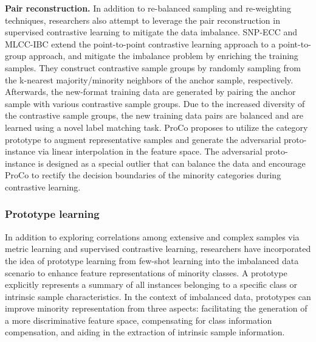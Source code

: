  
\textbf{Pair reconstruction.} 
In addition to re-balanced sampling and re-weighting techniques, researchers also attempt to leverage the {pair reconstruction} in supervised contrastive learning to mitigate the data imbalance.
SNP-ECC \cite{gao2022ensemble} and MLCC-IBC \cite{gao2023imbalanced} extend the point-to-point contrastive learning approach to a point-to-group approach, and mitigate the imbalance problem by enriching the training samples. They construct contrastive sample groups by randomly sampling from the k-nearest majority/minority neighbors of the anchor sample, respectively. Afterwards, the new-format training data are generated by pairing the anchor sample with various contrastive sample groups. Due to the increased diversity of the contrastive sample groups, the new training data pairs are balanced and are learned using a novel label matching task.
ProCo \cite{yang2022proco} proposes to utilize the category prototype to augment representative samples and generate the adversarial proto-instance via linear interpolation in the feature space. The adversarial proto-instance is designed as a special outlier that can balance the data and encourage ProCo to rectify the decision boundaries of the minority categories during contrastive learning.



\subsubsection{Prototype learning}
In addition to exploring correlations among extensive and complex samples via metric learning and supervised contrastive learning, researchers have incorporated the idea of prototype learning \cite{snell2017prototypical} from few-shot learning into the imbalanced data scenario to enhance feature representations of minority classes.
A prototype explicitly represents a summary of all instances belonging to a specific class or intrinsic sample characteristics. In the context of imbalanced data, prototypes can improve minority representation from three aspects: {facilitating the generation of a more discriminative feature space}, {compensating for class information compensation}, and {aiding in the extraction of intrinsic sample information}.


